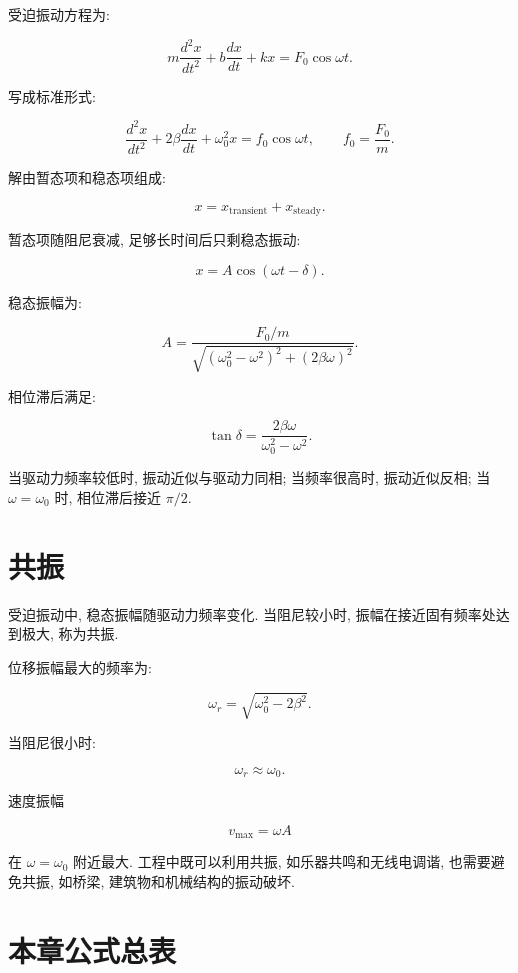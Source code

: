 \documentclass[
  a4paper,
]{ctexrep}
\begin{document}
受迫振动方程为:

\[
m\frac{d^2x}{dt^2}+b\frac{dx}{dt}+kx=F_0\cos\omega t.
\]

写成标准形式:

\[
\frac{d^2x}{dt^2}+2\beta\frac{dx}{dt}+\omega_0^2x=f_0\cos\omega t,
\qquad f_0=\frac{F_0}{m}.
\]

解由暂态项和稳态项组成:

\[
x=x_{\mathrm{transient}}+x_{\mathrm{steady}}.
\]

暂态项随阻尼衰减, 足够长时间后只剩稳态振动:

\[
x=A\cos(\omega t-\delta).
\]

稳态振幅为:

\[
A=\frac{F_0/m}{\sqrt{(\omega_0^2-\omega^2)^2+(2\beta\omega)^2}}.
\]

相位滞后满足:

\[
\tan\delta=\frac{2\beta\omega}{\omega_0^2-\omega^2}.
\]

当驱动力频率较低时, 振动近似与驱动力同相; 当频率很高时, 振动近似反相; 当
\(\omega=\omega_0\) 时, 相位滞后接近 \(\pi/2\).

\section{共振}\label{ux5171ux632f}

受迫振动中, 稳态振幅随驱动力频率变化. 当阻尼较小时,
振幅在接近固有频率处达到极大, 称为共振.

位移振幅最大的频率为:

\[
\omega_r=\sqrt{\omega_0^2-2\beta^2}.
\]

当阻尼很小时:

\[
\omega_r\approx\omega_0.
\]

速度振幅

\[
v_{\max}=\omega A
\]

在 \(\omega=\omega_0\) 附近最大. 工程中既可以利用共振,
如乐器共鸣和无线电调谐, 也需要避免共振, 如桥梁,
建筑物和机械结构的振动破坏.

\section{本章公式总表}\label{ux672cux7ae0ux516cux5f0fux603bux8868-1}
\end{document}
